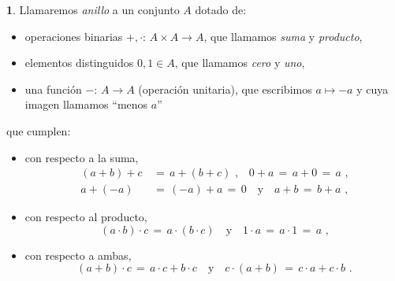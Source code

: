 \theoremstyle{plain}
\newtheorem{teoEuclidianos}{\teoname}[section]
\newtheorem{coroEuclidianos}[teoEuclidianos]{\coroname}

\theoremstyle{definition}
\newtheorem{defEuclidianos}[teoEuclidianos]{}
\newtheorem{obsEuclidianos}[teoEuclidianos]{\obsname}
\newtheorem{ejemEuclidianos}[teoEuclidianos]{\ejemname}


\begin{defEuclidianos}\label{def:anillo}
	Llamaremos \emph{anillo} a un conjunto $A$ dotado de:
	\begin{itemize}
		\item operaciones binarias $+,\cdot:\,A\times A\rightarrow A$,
			que llamamos \emph{suma} y \emph{producto},
		\item elementos distinguidos $0,1\in A$, que llamamos
			\emph{cero} y \emph{uno},
		\item una funci\'on $-:\,A\rightarrow A$ (operaci\'on
			unitaria), que escribimos $a\mapsto -a$ y cuya imagen
			llamamos ``menos $a$''
	\end{itemize}
	que cumplen:
	\begin{itemize}
		\item con respecto a la suma,
			\begin{displaymath}
				\begin{aligned}
					(a+b)+c & \,=\,a+(b+c)\text{ ,}\quad
					0+a \,=\,a+0\,=\,a\text{ ,} \\
					a+(-a) & \,=\,(-a)+a\,=\,0
						\quad\text{y}\quad
					a+b \,=\,b+a
					\text{ ,}
				\end{aligned}
			\end{displaymath}
		\item con respecto al producto,
			\begin{displaymath}
				(a\cdot b)\cdot c \,=\, a\cdot (b\cdot c)
					\quad\text{y}\quad
					1\cdot a \,=\,a\cdot 1\,=\,a
				\text{ ,}
			\end{displaymath}
		\item con respecto a ambas,
			\begin{displaymath}
				(a+b)\cdot c\,=\,a\cdot c+b\cdot c
					\quad\text{y}\quad
					c\cdot (a+b)\,=\,c\cdot a+c\cdot b
				\text{ .}
			\end{displaymath}
	\end{itemize}
\end{defEuclidianos}

